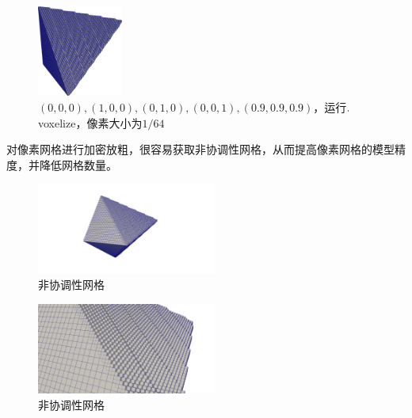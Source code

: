 \begin{figure}[!htbp]
  \centering
  \includegraphics[height=3cm]{fig/1/1.2/12.png}
    \caption{$(0,0,0),(1,0,0),(0,1,0),(0,0,1),(0.9,0.9,0.9)$，运行$.\\$voxelize，像素大小为$1/64$}
  \label{fig:1-7}
\end{figure}

\newpage

对像素网格进行加密放粗，很容易获取非协调性网格，从而提高像素网格的模型精度，并降低网格数量。

\begin{figure}[!htbp]
  \centering
  \includegraphics[height=3cm]{fig/1/1.2/13.png}
  \caption{非协调性网格}
  \label{fig:1-7}
\end{figure}

\begin{figure}[!htbp]
  \centering
  \includegraphics[height=3cm]{fig/1/1.2/14.png}
  \caption{非协调性网格}
  \label{fig:1-7}
\end{figure}

